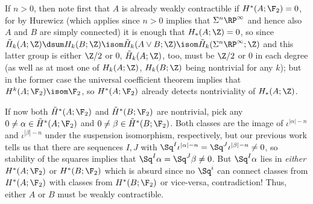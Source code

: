 \begin{solution}
	If $n > 0$, then note first that $A$ is already weakly contractible if $H^*(A; \F_2) = 0$, for by Hurewicz (which applies since $n > 0$ implies that $\Sigma^n \RP^\infty$ and hence also $A$ and $B$ are simply connected) it is enough that $H_*(A; \Z) = 0$, so since $\tilde{H}_k(A; \Z) \dsum H_k(B; \Z) \isom \tilde{H}_k(A \vee B; \Z) \isom \tilde{H}_k(\Sigma^n \RP^\infty; \Z)$ and this latter group is either $\Zn{2}$ or 0, $\tilde{H}_k(A; \Z)$, too, must be $\Zn{2}$ or 0 in each degree (as well as at most one of $H_k(A; \Z)$, $H_k(B; \Z)$ being nontrivial for any $k$); but in the former case the universal coefficient theorem implies that $H^k(A; \F_2) \isom \F_2$, so $H^*(A; \F_2)$ already detects nontriviality of $H_*(A; \Z)$.
	
	If now both $\tilde{H}^*(A; \F_2)$ and $\tilde{H}^*(B; \F_2)$ are nontrivial, pick any $0 \neq \alpha \in \tilde{H}^*(A; \F_2)$ and $0 \neq \beta \in \tilde{H}^*(B; \F_2)$.
	Both classes are the image of $\iota^{|\alpha| - n}$ and $\iota^{|\beta| - n}$ under the suspension isomorphism, respectively, but our previous work tells us that there are sequences $I, J$ with $\Sq^I \iota^{|\alpha| - n} = \Sq^J \iota^{|\beta| - n} \neq 0$, so stability of the squares implies that $\Sq^I \alpha = \Sq^J \beta \neq 0$.
	But $\Sq^I \alpha$ lies in \emph{either} $H^*(A; \F_2)$ or $H^*(B; \F_2)$ which is absurd since no $\Sq^i$ can connect classes from $H^*(A; \F_2)$ with classes from $H^*(B; \F_2)$ or vice-versa, contradiction!
	Thus, either $A$ or $B$ must be weakly contractible.
\end{solution}

